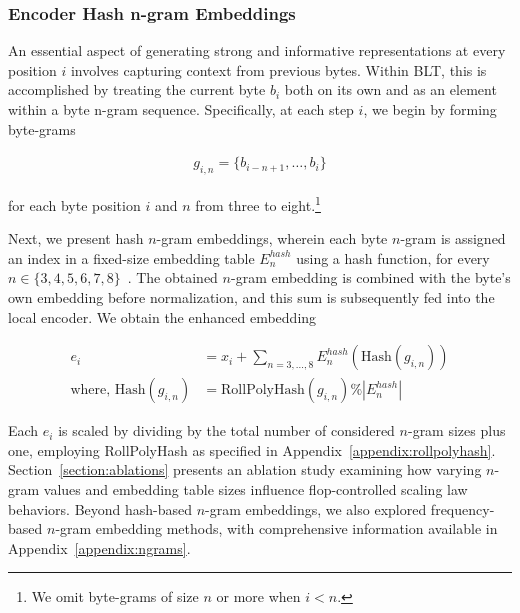 \subsubsection{Encoder Hash n-gram Embeddings}
\label{sec:ngram-emb}
\label{sec:hash-emb}
An essential aspect of generating strong and informative representations at every position $i$ involves capturing context from previous bytes. Within {\textsc BLT}, this is accomplished by treating the current byte $b_i$ both on its own and as an element within a byte n-gram sequence. Specifically, at each step $i$, we begin by forming byte-grams

\begin{align}
    g_{i,n}=\{b_{i-n + 1},\ldots, b_i\}
\end{align}

for each byte position $i$ and $n$ from three to eight.\footnote{
We omit byte-grams of size $n$ or more when $i<n$. }

Next, we present hash $n$-gram embeddings, wherein each byte $n$-gram is assigned an index in a fixed-size embedding table $E_{n}^{hash}$ using a hash function, for every $n \in\{3,4,5,6,7,8\}$~\citep{bai2010learning}. The obtained $n$-gram embedding is combined with the byte’s own embedding before normalization, and this sum is subsequently fed into the local encoder. We obtain the enhanced embedding

\begin{align}
e_i &= x_i + \sum_{n = 3,...,8}E_{n}^{hash}(\text{Hash}(g_{i,n})) \\
\text{where, Hash}(g_{i,n}) &= \text{RollPolyHash}(g_{i,n}) \% |E_{n}^{hash}|
\end{align}

Each $e_i$ is scaled by dividing by the total number of considered $n$-gram sizes plus one, employing RollPolyHash as specified in Appendix~\ref{appendix:rollpolyhash}. Section~\ref{section:ablations} presents an ablation study examining how varying $n$-gram values and embedding table sizes influence flop-controlled scaling law behaviors. Beyond hash-based $n$-gram embeddings, we also explored frequency-based $n$-gram embedding methods, with comprehensive information available in Appendix~\ref{appendix:ngrams}.

